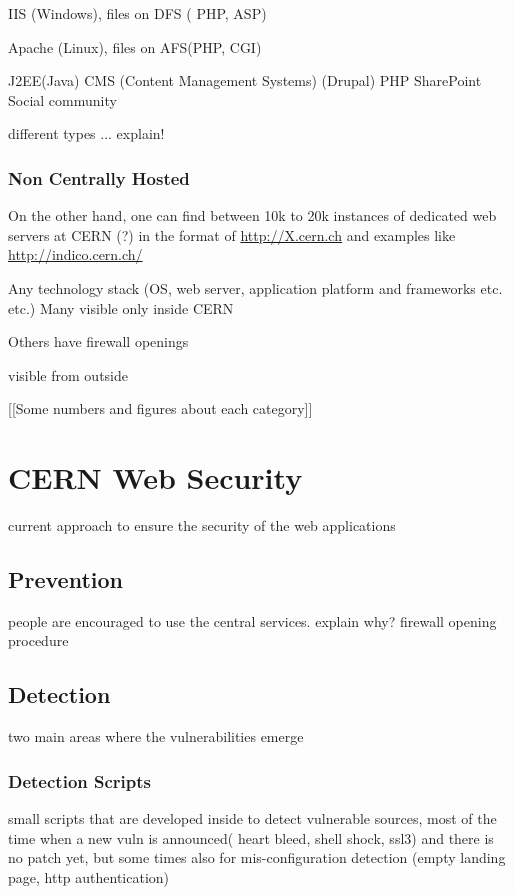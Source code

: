IIS (Windows), files on DFS ( PHP, ASP)

Apache (Linux), files on AFS(PHP, CGI)

J2EE(Java) 
CMS (Content Management Systems) (Drupal) PHP
SharePoint
Social community











different types ... explain!
\subsubsection{Non Centrally Hosted}

On the other hand, one can find between 10k to 20k instances of dedicated web servers at CERN (?) in the format of \url{http://X.cern.ch} and examples like \url{http://indico.cern.ch/}

Any technology stack (OS, web server, application platform
and frameworks etc. etc.)
Many visible only inside CERN

Others have firewall openings

visible from outside

[[Some numbers and figures about each category]]


\section{CERN Web Security}
current approach to ensure the security of the web applications
\subsection{Prevention}
people are encouraged to use the central services. explain why?
firewall opening procedure

\subsection{Detection}
two main areas where the vulnerabilities emerge
\subsubsection{Detection Scripts}
small scripts that are developed inside to detect vulnerable sources, most of the time when a new vuln is announced( heart bleed, shell shock, ssl3) and there is no patch yet, but some times also for mis-configuration detection (empty landing page, http authentication)

